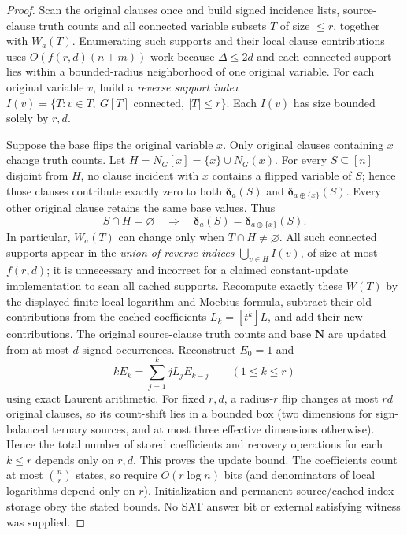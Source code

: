 \documentclass[11pt]{article}
\newcommand{\vN}{\boldsymbol{N}}
\newcommand{\bdelta}{\boldsymbol{\delta}}
\begin{document}
\begin{proof}
Scan the original clauses once and build signed incidence lists, source-clause truth counts and all connected variable subsets $T$ of size $\le r$, together with $W_a(T)$. Enumerating such supports and their local clause contributions uses $O(f(r,d)(n+m))$ work because $\Delta\le2d$ and each connected support lies within a bounded-radius neighborhood of one original variable. For each original variable $v$, build a \emph{reverse support index} $I(v)=\{T:v\in T,\ G[T]\text{ connected},\ |T|\le r\}$. Each $I(v)$ has size bounded solely by $r,d$.

Suppose the base flips the original variable $x$. Only original clauses containing $x$ change truth counts. Let $H=N_G[x]=\{x\}\cup N_G(x)$. For every $S\subseteq[n]$ disjoint from $H$, no clause incident with $x$ contains a flipped variable of $S$; hence those clauses contribute exactly zero to both $\bdelta_a(S)$ and $\bdelta_{a\oplus\{x\}}(S)$. Every other original clause retains the same base values. Thus
\[
 S\cap H=\varnothing\quad\Longrightarrow\quad \bdelta_a(S)=\bdelta_{a\oplus\{x\}}(S).
\]
In particular, $W_a(T)$ can change only when $T\cap H\ne\varnothing$. All such connected supports appear in the \emph{union of reverse indices} $\bigcup_{v\in H}I(v)$, of size at most $f(r,d)$; it is unnecessary and incorrect for a claimed constant-update implementation to scan all cached supports. Recompute exactly these $W(T)$ by the displayed finite local logarithm and Moebius formula, subtract their old contributions from the cached coefficients $L_k=[t^k]L$, and add their new contributions. The original source-clause truth counts and base $\vN$ are updated from at most $d$ signed occurrences. Reconstruct $E_0=1$ and
\[
 kE_k=\sum_{j=1}^k jL_jE_{k-j}\qquad(1\le k\le r)
\]
using exact Laurent arithmetic. For fixed $r,d$, a radius-$r$ flip changes at most $rd$ original clauses, so its count-shift lies in a bounded box (two dimensions for sign-balanced ternary sources, and at most three effective dimensions otherwise). Hence the total number of stored coefficients and recovery operations for each $k\le r$ depends only on $r,d$. This proves the update bound. The coefficients count at most $\binom nr$ states, so require $O(r\log n)$ bits (and denominators of local logarithms depend only on $r$). Initialization and permanent source/cached-index storage obey the stated bounds. No SAT answer bit or external satisfying witness was supplied.\end{proof}
\end{document}
